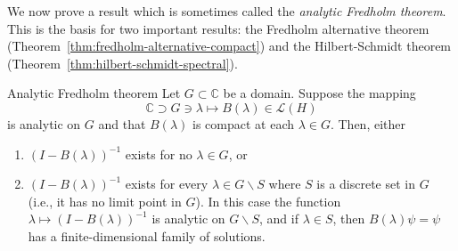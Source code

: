 We now prove a result which is sometimes called the \emph{analytic Fredholm theorem}. This is the basis for two important results: the Fredholm alternative theorem (Theorem~\ref{thm:fredholm-alternative-compact}) and the Hilbert-Schmidt theorem (Theorem~\ref{thm:hilbert-schmidt-spectral}).

\begin{Theorem}{Analytic Fredholm theorem}
\label{thm:analytic-fredholm}
Let $G\subset\mathbb{C}$ be a domain. Suppose the mapping
\begin{equation}\label{eq:analytic-compact-fredholm-operator-family}
\mathbb{C}\supset G\ni\lambda\mapsto B(\lambda)\in\mathcal{L}(H)
\end{equation}
is analytic on $G$ and that $B(\lambda)$ is compact at each $\lambda\in G$. Then, either\begin{enumerate}\item $(I-B(\lambda))^{-1}$ exists for no $\lambda\in G$, or\item $(I-B(\lambda))^{-1}$ exists for every $\lambda\in G\backslash S$ where $S$ is a discrete set in $G$ (i.e., it has no limit point in $G$). In this case the function $\lambda\mapsto(I-B(\lambda))^{-1}$ is analytic on $G\backslash S$, and if $\lambda\in S$, then $B(\lambda)\psi=\psi$ has a finite-dimensional family of solutions.\end{enumerate}
\end{Theorem}


